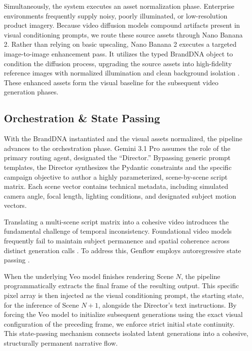 \documentclass[sigconf,authordraft]{acmart}
\begin{document}
Simultaneously, the system executes an asset normalization phase. Enterprise environments frequently supply noisy, poorly illuminated, or low-resolution product imagery. Because video diffusion models compound artifacts present in visual conditioning prompts, we route these source assets through Nano Banana 2. Rather than relying on basic upscaling, Nano Banana 2 executes a targeted image-to-image enhancement pass. It utilizes the typed BrandDNA object to condition the diffusion process, upgrading the source assets into high-fidelity reference images with normalized illumination and clean background isolation \cite{ramesh2022high}. These enhanced assets form the visual baseline for the subsequent video generation phases.

\subsection{Orchestration \& State Passing}

With the BrandDNA instantiated and the visual assets normalized, the pipeline advances to the orchestration phase. Gemini 3.1 Pro assumes the role of the primary routing agent, designated the ``Director.'' Bypassing generic prompt templates, the Director synthesizes the Pydantic constraints and the specific campaign objective to author a highly parameterized, scene-by-scene script matrix. Each scene vector contains technical metadata, including simulated camera angle, focal length, lighting conditions, and designated subject motion vectors.

Translating a multi-scene script matrix into a cohesive video introduces the fundamental challenge of temporal inconsistency. Foundational video models frequently fail to maintain subject permanence and spatial coherence across distinct generation calls \cite{blattmann2024temporal}. To address this, Genflow employs autoregressive state passing \cite{blattmann2024align}.

When the underlying Veo model finishes rendering Scene $N$, the pipeline programmatically extracts the final frame of the resulting output. This specific pixel array is then injected as the visual conditioning prompt, the starting state, for the inference of Scene $N+1$, alongside the Director's text instructions. By forcing the Veo model to initialize subsequent generations using the exact visual configuration of the preceding frame, we enforce strict initial state continuity. This state-passing mechanism connects isolated latent generations into a cohesive, structurally permanent narrative flow.
\end{document}
